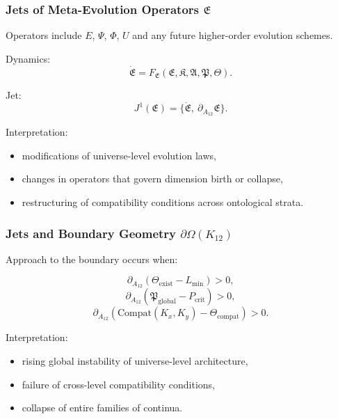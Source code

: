 \subsubsection{Jets of Meta-Evolution Operators $\mathfrak{E}$}

Operators include $E$, $\Psi$, $\Phi$, $U$ and any future higher-order
evolution schemes.

Dynamics:
\[
\dot{\mathfrak{E}}
=
F_{\mathfrak{E}}(\mathfrak{E},\mathfrak{K},\mathfrak{A},\mathfrak{P},\mathfrak{\Theta}).
\]

Jet:
\[
J^1(\mathfrak{E})
= \{\dot{\mathfrak{E}},\ \partial_{A_{12}}\mathfrak{E}\}.
\]

Interpretation:
\begin{itemize}
    \item modifications of universe-level evolution laws,
    \item changes in operators that govern dimension birth or collapse,
    \item restructuring of compatibility conditions across ontological strata.
\end{itemize}


\subsubsection{Jets and Boundary Geometry $\partial\Omega(K_{12})$}

Approach to the boundary occurs when:

\[
\partial_{A_{12}}(\mathfrak{\Theta}_{\mathrm{exist}} - L_{\mathrm{min}}) > 0,
\]
\[
\partial_{A_{12}}(\mathfrak{P}_{\mathrm{global}} - P_{\mathrm{crit}}) > 0,
\]
\[
\partial_{A_{12}}(\mathrm{Compat}(K_x,K_y) - \Theta_{\mathrm{compat}}) > 0.
\]

Interpretation:
\begin{itemize}
    \item rising global instability of universe-level architecture,
    \item failure of cross-level compatibility conditions,
    \item collapse of entire families of continua.
\end{itemize}


